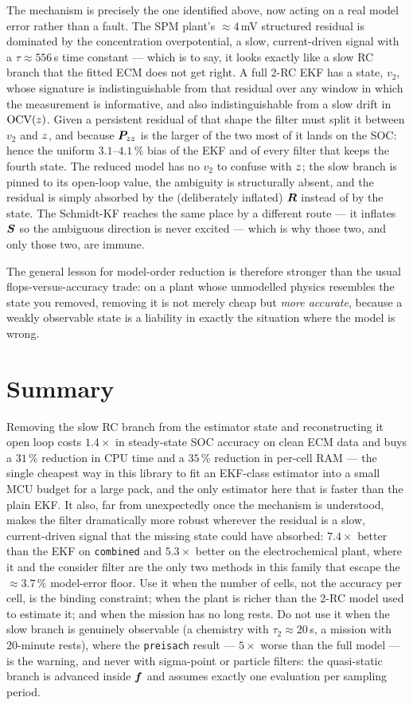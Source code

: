 The mechanism is precisely the one identified above, now acting on a real model error rather than a
fault.  The SPM plant's $\approx4$\,mV structured residual is dominated by the concentration
overpotential, a slow, current-driven signal with a $\tau\approx556$\,s time constant --- which is
to say, it looks exactly like a slow RC branch that the fitted ECM does not get right.  A full 2-RC
EKF has a state, $v_2$, whose signature is indistinguishable from that residual over any window in
which the measurement is informative, and also indistinguishable from a slow drift in $\mathrm{OCV}(z)$.
Given a persistent residual of that shape the filter must split it between $v_2$ and $z$, and
because $\bm{P}_{zz}$ is the larger of the two most of it lands on the SOC: hence the uniform
$3.1$--$4.1\,\%$ bias of the EKF and of every filter that keeps the fourth state.  The reduced model
has no $v_2$ to confuse with $z$; the slow branch is pinned to its open-loop value, the ambiguity
is structurally absent, and the residual is simply absorbed by the (deliberately inflated) $\bm{R}$
instead of by the state.  The Schmidt-KF reaches the same place by a different route --- it inflates
$\bm{S}$ so the ambiguous direction is never excited --- which is why those two, and only those two,
are immune.

The general lesson for model-order reduction is therefore stronger than the usual
flops-versus-accuracy trade: on a plant whose unmodelled physics resembles the state you removed,
removing it is not merely cheap but \emph{more accurate}, because a weakly observable state is a
liability in exactly the situation where the model is wrong.


\section{Summary}
Removing the slow RC branch from the estimator state and reconstructing it open loop costs
$1.4\times$ in steady-state SOC accuracy on clean ECM data and buys a $31\,\%$ reduction in CPU
time and a $35\,\%$ reduction in per-cell RAM --- the single cheapest way in this library to fit an
EKF-class estimator into a small MCU budget for a large pack, and the only estimator here that is
faster than the plain EKF.  It also, far from unexpectedly once the mechanism is understood, makes
the filter dramatically more robust wherever the residual is a slow, current-driven signal that the
missing state could have absorbed: $7.4\times$ better than the EKF on \texttt{combined} and
$5.3\times$ better on the electrochemical plant, where it and the consider filter are the only two
methods in this family that escape the $\approx3.7\,\%$ model-error floor.  Use it when the number
of cells, not the accuracy per cell, is the binding constraint; when the plant is richer than the
2-RC model used to estimate it; and when the mission has no long rests.  Do not use it when the
slow branch is genuinely observable (a chemistry with $\tau_2\approx20$\,s, a mission with
20-minute rests), where the \texttt{preisach} result --- $5\times$ worse than the full model --- is
the warning, and never with sigma-point or particle filters: the quasi-static branch is advanced
inside $\bm{f}$ and assumes exactly one evaluation per sampling period.

